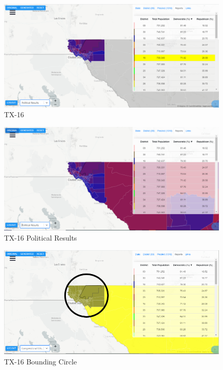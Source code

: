 \documentclass[letterpaper]{article}
\begin{document}
\begin{figure}[H]
	\includegraphics[width=\linewidth]{./figures/TX-16.png}
	\caption{TX-16}
	\label{fig:tx16border}
\end{figure}

\begin{figure}[H]
	\includegraphics[width=\linewidth]{./figures/TX-16-SurroundingArea.png}
	\caption{TX-16 Political Results}
	\label{fig:tx16political}
\end{figure}

\begin{figure}[H]
	\includegraphics[width=\linewidth]{./figures/TX-16-BoundingCircle.png}
	\caption{TX-16 Bounding Circle}
	\label{fig:tx16boundingCircle}
\end{figure}
\end{document}
